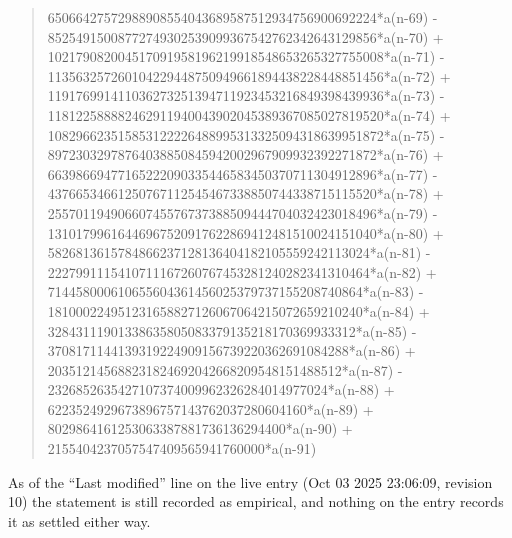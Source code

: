 \documentclass[11pt,a4paper]{article}
\theoremstyle{plain}
\theoremstyle{definition}
\begin{document}
\begin{quote}
65066427572988908554043689587512934756900692224*a(n-69) - 85254915008772749302539099367542762342643129856*a(n-70) + 102179082004517091958196219918548653265327755008*a(n-71) - 113563257260104229448750949661894438228448851456*a(n-72) + 119176991411036273251394711923453216849398439936*a(n-73) - 118122588882462911940043902045389367085027819520*a(n-74) + 108296623515853122226488995313325094318639951872*a(n-75) - 89723032978764038850845942002967909932392271872*a(n-76) + 66398669477165222090335446583450370711304912896*a(n-77) - 43766534661250767112545467338850744338715115520*a(n-78) + 25570119490660745576737388509444704032423018496*a(n-79) - 13101799616446967520917622869412481510024151040*a(n-80) + 5826813615784866237128136404182105559242113024*a(n-81) - 2227991115410711167260767453281240282341310464*a(n-82) + 714458000610655604361456025379737155208740864*a(n-83) - 181000224951231658827126067064215072659210240*a(n-84) + 32843111901338635805083379135218170369933312*a(n-85) - 3708171144139319224909156739220362691084288*a(n-86) + 203512145688231824692042668209548151488512*a(n-87) - 2326852635427107374009962326284014977024*a(n-88) + 6223524929673896757143762037280604160*a(n-89) + 8029864161253063387881736136294400*a(n-90) + 2155404237057547409565941760000*a(n-91)
\end{quote}
As of the ``Last modified'' line on the live entry (Oct 03 2025 23:06:09, revision 10) the statement is
still recorded as empirical, and nothing on the entry records it as settled either way.
\end{document}
